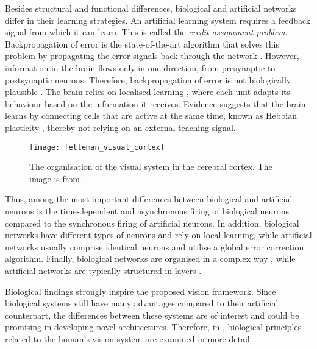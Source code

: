 Besides structural and functional differences, biological and artificial networks differ in their learning strategies.
An artificial learning system requires a feedback signal from which it can learn.
This is called the \emph{credit assignment problem}.
Backpropagation of error  is the state-of-the-art algorithm that solves this problem by propagating the error signals back through the network .
However, information in the brain flows only in one direction, from presynaptic to postsynaptic neurons.
Therefore, backpropagation of error is not biologically plausible .
The brain relies on localised learning , where each unit adapts its behaviour based on the information it receives.
Evidence suggests that the brain learns by connecting cells that are active at the same time, known as Hebbian plasticity , thereby not relying on an external teaching signal.

\begin{figure}[h]
    \centering
    \texttt{[image: felleman\_visual\_cortex]}
    \caption[Organisation of the visual system in the cerebral cortex]{The organisation of the visual system in the cerebral cortex. The image is from .}
\end{figure}

Thus, among the most important differences between biological and artificial neurons is the time-dependent and asynchronous firing of biological neurons compared to the synchronous firing of artificial neurons. In addition, biological networks have different types of neurons and rely on local learning, while artificial networks usually comprise identical neurons and utilise a global error correction algorithm. Finally, biological networks are organised in a complex way \cite{felleman_distributed_1991}, while artificial networks are typically structured in layers \cite{goodfellow_deep_2016}.

Biological findings strongly inspire the proposed vision framework.
Since biological systems still have many advantages compared to their artificial counterpart, the differences between these systems are of interest and could be promising in developing novel architectures.
Therefore, in , biological principles related to the human's vision system are examined in more detail.

